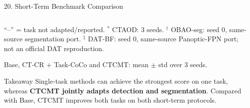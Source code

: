 \documentclass[aspectratio=169,11pt]{beamer}
\begin{document}
\begin{frame}{20. Short-Term Benchmark Comparison}
\begin{tabular}{lcccc}
\bottomrule
\end{tabular}

\vspace{0.02cm}

{\fontsize{5.3}{5.9}\selectfont
\raggedright
``--'' = task not adapted/reported.
$^\ast$ CTAOD: 3 seeds.
$^\dagger$ OBAO-seg: seed 0, same-source segmentation port.
$^\ddagger$ DAT-BF: seed 0, same-source Panoptic-FPN port; not an official DAT reproduction.

Base, CT-CR + Task-CoCo and CTCMT: mean $\pm$ std over 3 seeds.
\par
}

\vspace{-0.04cm}

\begin{block}{Takeaway}
\fontsize{5.8}{6.4}\selectfont
Single-task methods can achieve the strongest score on one task,
whereas \textbf{CTCMT jointly adapts detection and segmentation}.
Compared with Base, CTCMT improves both tasks on both short-term protocols.
\end{block}

\end{frame}
\end{document}
